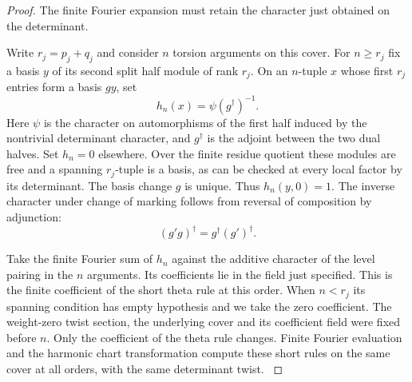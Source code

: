 \begin{proof}
The finite Fourier expansion must retain the character just obtained on the determinant.

Write \(r_j=p_j+q_j\) and consider \(n\) torsion arguments on
this cover. For \(n\ge r_j\) fix a basis \(y\) of its second
split half module of rank \(r_j\). On an \(n\)-tuple \(x\)
whose first \(r_j\) entries form a basis \(g y\), set
\[
              h_n(x)=\psi(g^\dagger)^{-1}.
\]
Here \(\psi\) is the character on automorphisms of the first
half induced by the nontrivial determinant character, and
\(g^\dagger\) is the adjoint between the two dual halves.
Set \(h_n=0\) elsewhere. Over the finite residue quotient these
modules are free and a spanning \(r_j\)-tuple is a basis,
as can be checked at every local factor by its determinant.
The basis change \(g\) is unique. Thus \(h_n(y,0)=1\). The inverse character under change of marking follows from reversal of composition by adjunction:
\[
 (g'g)^\dagger=g^\dagger(g')^\dagger .
\]

Take the finite Fourier
sum of \(h_n\) against the additive character of the level
pairing in the \(n\) arguments. Its coefficients lie in the
field just specified. This is the finite coefficient of the
short theta rule at this order. When \(n<r_j\) its spanning
condition has empty hypothesis and we take the zero coefficient.
The weight-zero twist section, the underlying cover and its
coefficient field were fixed before \(n\). Only the coefficient
of the theta rule changes. Finite Fourier evaluation and the
harmonic chart transformation compute these short rules on the
same cover at all orders, with the same determinant twist.
\label{cor:split-level-sections-4}
\end{proof}
